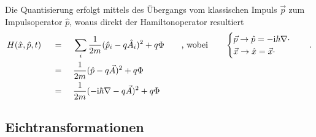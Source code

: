 \documentclass[a4paper,11pt]{article}
\newcommand{\+}{\dagger}
\renewcommand{\v}{\vec}
\renewcommand{\^}{\hat}
\renewcommand{\tt}{\text}
\renewcommand{\~}{\widetilde}
\begin{document}
Die Quantisierung erfolgt mittels des Übergangs vom klassischen Impuls $\v p$ zum Impulsoperator $\^p$, woaus direkt der Hamiltonoperator resultiert
\begin{alignat*}{5}
& H(\^ x,\^ p,t)&& \ =\  && \sum_i \frac{1}{2m}(\^ p_i-q \^A_i)^2+q\Phi  &&\quad \tt{, wobei}\quad &&
\begin{cases}
   \v p \rightarrow \^p=-\tt i \hbar \nabla\cdot \\
     \v x \rightarrow \^x=\v x \cdot  
\end{cases} \quad. \\
& && \ = \ && \frac{1}{2m}(\^ p -q \v A)^2+q\Phi &&  &&  \\
& && \ = \ && \frac{1}{2m}(-\tt i \hbar \nabla -q \v A)^2+q\Phi 
\end{alignat*}
\subsection{Eichtransformationen}
\end{document}
